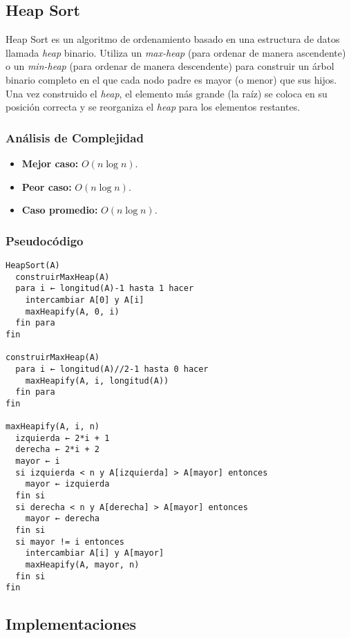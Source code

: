 \documentclass[11pt,openany]{book}
\begin{document}
\subsection{Heap Sort}
Heap Sort es un algoritmo de ordenamiento basado en una estructura de datos llamada \textit{heap} binario. Utiliza un \textit{max-heap} (para ordenar de manera ascendente) o un \textit{min-heap} (para ordenar de manera descendente) para construir un árbol binario completo en el que cada nodo padre es mayor (o menor) que sus hijos. Una vez construido el \textit{heap}, el elemento más grande (la raíz) se coloca en su posición correcta y se reorganiza el \textit{heap} para los elementos restantes.

\subsubsection{Análisis de Complejidad}
\begin{itemize}
    \item \textbf{Mejor caso:} $O(n \log n)$.
    \item \textbf{Peor caso:} $O(n \log n)$.
    \item \textbf{Caso promedio:} $O(n \log n)$.
\end{itemize}

\subsubsection{Pseudocódigo}
\begin{verbatim}
HeapSort(A)
  construirMaxHeap(A)
  para i ← longitud(A)-1 hasta 1 hacer
    intercambiar A[0] y A[i]
    maxHeapify(A, 0, i)
  fin para
fin

construirMaxHeap(A)
  para i ← longitud(A)//2-1 hasta 0 hacer
    maxHeapify(A, i, longitud(A))
  fin para
fin

maxHeapify(A, i, n)
  izquierda ← 2*i + 1
  derecha ← 2*i + 2
  mayor ← i
  si izquierda < n y A[izquierda] > A[mayor] entonces
    mayor ← izquierda
  fin si
  si derecha < n y A[derecha] > A[mayor] entonces
    mayor ← derecha
  fin si
  si mayor != i entonces
    intercambiar A[i] y A[mayor]
    maxHeapify(A, mayor, n)
  fin si
fin
\end{verbatim}

\subsection{Implementaciones}
\end{document}
